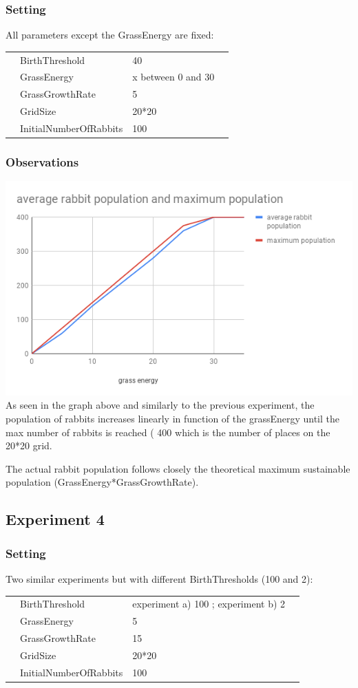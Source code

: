 \documentclass[11pt]{article}
\begin{document}
 \subsubsection{Setting}
 All parameters except the GrassEnergy are fixed:
 \begin{table}[H]
  \begin{tabular}{llll}
   &BirthThreshold  &40\\
   &GrassEnergy  &x between 0 and 30 \\
   &GrassGrowthRate  &5\\
   &GridSize  &20*20\\
   &InitialNumberOfRabbits  &100
  \end{tabular}
 \end{table}

 \subsubsection{Observations}
 \includegraphics[width=\textwidth]{grassenergy.png}
 As seen in the graph above and similarly to the previous experiment, the population of rabbits increases linearly in function of the grassEnergy until the max number of rabbits is reached ( 400 which is the number of places on the 20*20 grid.

 The actual rabbit population follows closely the theoretical maximum sustainable population (GrassEnergy*GrassGrowthRate).

 \subsection{Experiment 4}
 \subsubsection{Setting}
 Two similar experiments but with different BirthThresholds (100 and 2):
 \begin{table}[H]
  \begin{tabular}{llll}
   &BirthThreshold  &experiment a) 100 ; experiment b) 2\\
   &GrassEnergy  &5\\
   &GrassGrowthRate  &15\\
   &GridSize  &20*20\\
   &InitialNumberOfRabbits  &100
  \end{tabular}
 \end{table}
\end{document}

